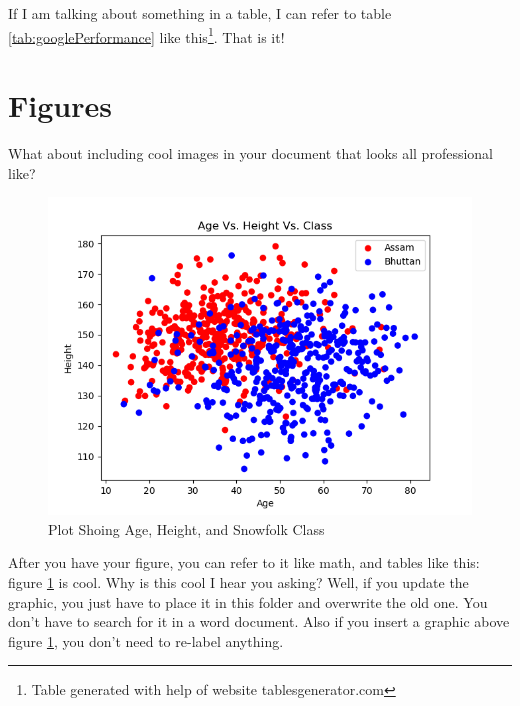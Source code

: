 \documentclass{article} %
\begin{document}
If I am talking about something in a table, I can refer to table \ref{tab:googlePerformance} like this\footnote{Table generated with help of website tablesgenerator.com}.
That is it!


\section{Figures} \label{sec:figures}

What about including cool images in your document that looks all professional like?



\begin{figure}[h!]
    \centering  %
    \includegraphics[width=.8\textwidth]{data_visuzlization.png} %
    \caption{Plot Shoing Age, Height, and Snowfolk Class} %
    \label{fig:dataViz} %
\end{figure}


%

After you have your figure, you can refer to it like math, and tables like this: figure \ref{fig:dataViz} is cool.
Why is this cool I hear you asking? Well, if you update the graphic, you just have to place it in this folder and overwrite the old one.
You don't have to search for it in a word document.
Also if you insert a graphic above figure \ref{fig:dataViz}, you don't need to re-label anything.
\end{document}
